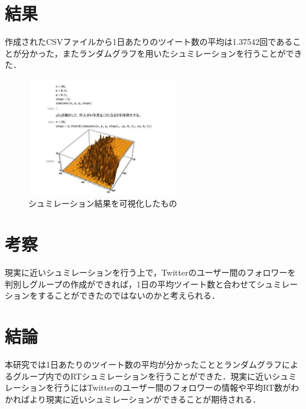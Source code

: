 \documentclass[uplatex,twocolumn,dvipdfmx]{jsarticle}
\begin{document}
\section{結果}

作成されたCSVファイルから1日あたりのツイート数の平均は1.37542回であることが分かった，またランダムグラフを用いたシュミレーションを行うことができた．


\begin{figure}[htb]
\centering
\includegraphics[width=66mm,clip]{rtsyumi.pdf}
\caption{シュミレーション結果を可視化したもの}\label{サンプル図}
\end{figure}

\section{考察}

現実に近いシュミレーションを行う上で，Twitterのユーザー間のフォロワーを判別しグループの作成ができれば，1日の平均ツイート数と合わせてシュミレーションをすることができたのではないのかと考えられる．

\section{結論}

本研究では1日あたりのツイート数の平均が分かったこととランダムグラフによるグループ内でのRTシュミレーションを行うことができた．現実に近いシュミレーションを行うにはTwitterのユーザー間のフォロワーの情報や平均RT数がわかればより現実に近いシュミレーションができることが期待される．


\end{document}
